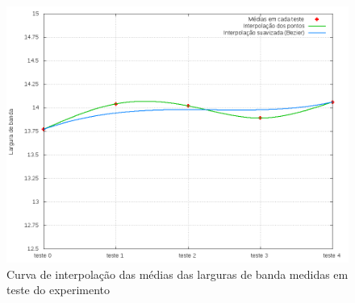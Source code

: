 \begin{figure}[!htb]
    \centering
    \label{fig:host_tracker-bandwidth-growth}
    \includegraphics[width=\linewidth]{img/host_tracker-bandwidth-growth}
    \caption{Curva de interpolação das médias das larguras de banda medidas 
    em teste do experimento}
\end{figure}
